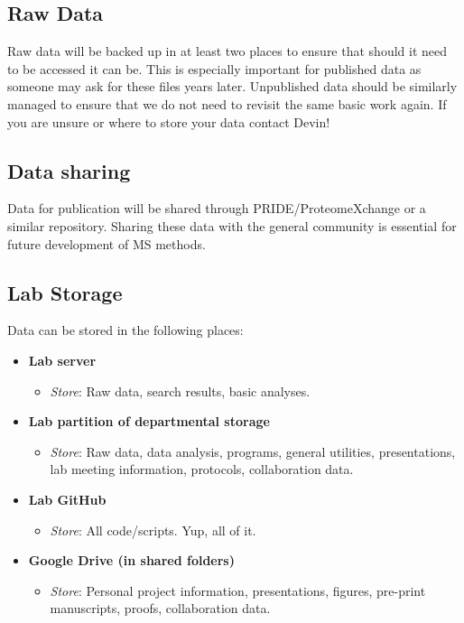 \documentclass[
]{book}
\providecommand{\tightlist}{%
  \setlength{\itemsep}{0pt}\setlength{\parskip}{0pt}}
\begin{document}
\hypertarget{raw-data}{%
\subsection{Raw Data}\label{raw-data}}

Raw data will be backed up in at least two places to ensure that should it need to be accessed it can be. This is especially important for published data as someone may ask for these files years later. Unpublished data should be similarly managed to ensure that we do not need to revisit the same basic work again. If you are unsure or where to store your data contact Devin!

\hypertarget{data-sharing}{%
\subsection{Data sharing}\label{data-sharing}}

Data for publication will be shared through PRIDE/ProteomeXchange or a similar repository. Sharing these data with the general community is essential for future development of MS methods.

\hypertarget{lab-storage}{%
\subsection{Lab Storage}\label{lab-storage}}

Data can be stored in the following places:

\begin{itemize}
\tightlist
\item
  \textbf{Lab server}

  \begin{itemize}
  \tightlist
  \item
    \emph{Store}: Raw data, search results, basic analyses.
  \end{itemize}
\item
  \textbf{Lab partition of departmental storage}

  \begin{itemize}
  \tightlist
  \item
    \emph{Store}: Raw data, data analysis, programs, general utilities, presentations, lab meeting information, protocols, collaboration data.
  \end{itemize}
\item
  \textbf{Lab GitHub}

  \begin{itemize}
  \tightlist
  \item
    \emph{Store}: All code/scripts. Yup, all of it.
  \end{itemize}
\item
  \textbf{Google Drive (in shared folders)}

  \begin{itemize}
  \tightlist
  \item
    \emph{Store}: Personal project information, presentations, figures, pre-print manuscripts, proofs, collaboration data.
  \end{itemize}
\end{itemize}
\end{document}
